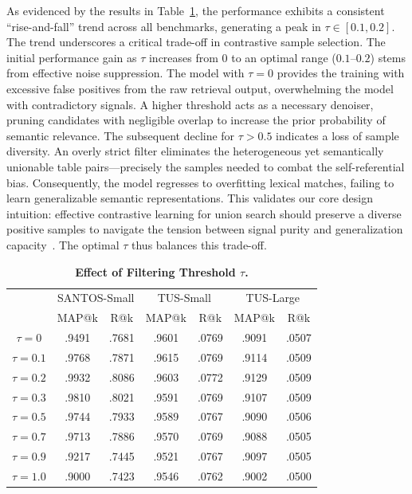 As evidenced by the results in Table~\ref{eff_tau}, the performance exhibits a consistent ``rise-and-fall'' trend across all benchmarks, generating a peak in  $\tau \in [0.1, 0.2]$. The trend underscores a critical trade-off in contrastive sample selection. The initial performance gain as $\tau$ increases from $0$ to an optimal range ($0.1$–$0.2$) stems from effective noise suppression. The model with $\tau=0$ provides the training with excessive false positives from the raw retrieval output, overwhelming the model with contradictory signals. A higher threshold acts as a necessary denoiser, pruning candidates with negligible overlap to increase the prior probability of semantic relevance. The subsequent decline for $\tau > 0.5$ indicates a loss of sample diversity. An overly strict filter eliminates the heterogeneous yet semantically unionable table pairs—precisely the samples needed to combat the self-referential bias. Consequently, the model regresses to overfitting  lexical matches, failing to learn generalizable semantic representations. This validates our core design intuition: effective contrastive learning for union search should preserve a diverse positive samples to navigate the tension between signal purity and generalization capacity~\cite{chen2020simple}. The optimal $\tau$ thus balances this trade-off.

\begin{table}[t]
  \centering
  \caption{\textbf{Effect of Filtering Threshold $\tau$.}}
  \label{eff_tau}
  \begin{tabular}{c|cc|cc|cc}
    \toprule 
    {\multirow{2}{*}{$\tau$}}&\multicolumn{2}{c|}{SANTOS-Small}&\multicolumn{2}{c|}{TUS-Small}&\multicolumn{2}{c}{TUS-Large}\\
    &MAP@k&R@k&MAP@k&R@k&MAP@k&R@k\\
    \midrule
    $\tau=0$&.9491&.7681&.9601&.0769&.9091&.0507\\
    $\tau=0.1$&.9768&.7871&.9615&.0769&.9114&.0509\\
    $\tau=0.2$&.9932&.8086&.9603&.0772&.9129&.0509\\
    $\tau=0.3$&.9810&.8021&.9591&.0769&.9107&.0509\\
    $\tau=0.5$&.9744&.7933&.9589&.0767&.9090&.0506\\
    $\tau=0.7$&.9713&.7886&.9570&.0769&.9088&.0505\\
    $\tau=0.9$&.9217&.7445&.9521&.0767&.9097&.0505\\
    $\tau=1.0$&.9000&.7423&.9546&.0762&.9002&.0500\\
  \bottomrule
\end{tabular}
\end{table}
\fi

